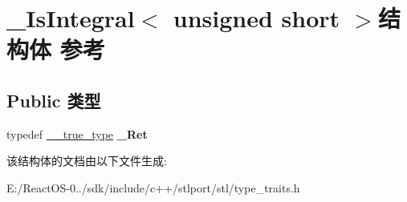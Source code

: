\hypertarget{struct___is_integral_3_01unsigned_01short_01_4}{}\section{\+\_\+\+Is\+Integral$<$ unsigned short $>$结构体 参考}
\label{struct___is_integral_3_01unsigned_01short_01_4}
\subsection*{Public 类型}
\begin{DoxyCompactItemize}
\item 
\mbox{\label{struct___is_integral_3_01unsigned_01short_01_4_abd0917365487c3e24274a061cfb7e0fc}} 
typedef \hyperlink{struct____true__type}{\+\_\+\+\_\+true\+\_\+type} {\bfseries \+\_\+\+Ret}
\end{DoxyCompactItemize}


该结构体的文档由以下文件生成\+:\begin{DoxyCompactItemize}
\item 
E\+:/\+React\+O\+S-\/0../sdk/include/c++/stlport/stl/type\+\_\+traits.\+h\end{DoxyCompactItemize}
